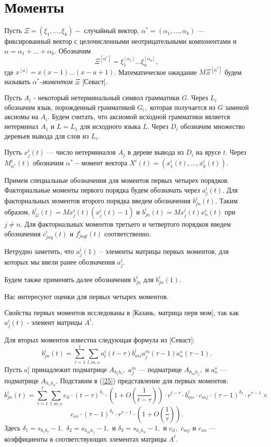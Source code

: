 \documentclass[12pt,russian]{article}
\begin{document}
\section{Моменты}
{\sloppy 
Пусть $\Xi=(\xi_1,\ldots,\xi_k) -$ случайный вектор,
$\alpha^*=(\alpha_1, \ldots,\alpha_k )$ --- фиксированный вектор
с целочисленными неотрицательными компонентами и
$\alpha=\alpha_1+\ldots+\alpha_k.$ Обозначим
$$
\Xi^{[\alpha^*]}=\xi_1^{[\alpha_1]} \ldots \xi_n^{[\alpha_k]},
$$
где $x^{[a]}=x(x-1)\ldots (x-a+1).$
Математическое ожидание $M\Xi^{[\alpha^*]}$ будем называть $\alpha^*$-{\em моментом\/} $\Xi$ [Севаст].

Пусть $A_i$ - некоторый нетерминальный символ грамматики $G$. Через $L_i$ обозначим язык, порожденный грамматикой $G_i,$ которая получается из $G$ заменой аксиомы на $A_i.$ Будем считать, что аксиомой исходной грамматики является нетерминал $A_1$ и $L=L_1$ для исходного языка $L.$ 
Через $D_i$ обозначим множество деревьев вывода для слов из $L_i.$ 

Пусть $x^i_j(t) $  --- число нетерминалов $A_j$ в дереве вывода из
$D_i$ на ярусе $t.$ Через $M^i_{\alpha^*}(t)$ обозначим
$\alpha^*-$момент вектора
$X^i(t)=(x^i_1(t),\ldots,x^i_k(t)).$

Примем специальные обозначения для моментов первых
четырех порядков.
Факториальные моменты первого порядка будем обозначать через $a^i_j(t).$
Для факториальных моментов второго порядка введем обозначения
$b^i_{jn}(t).$ Таким образом, $b^i_{jj}(t)=Mx^i_j(t)(x^i_j(t)-1)$ и
$b^i_{jn}(t)=Mx^i_j(t)x^i_n(t)$ при $j\neq n.$
Для факториальных моментов третьего и четвертого порядков введем обозначения
$c^i_{jnq}(t)$ и $f^i_{jnql}(t)$ соответственно.

Нетрудно заметить, что $a^i_j(1)$ -- элементы матрицы первых моментов,
для которых мы ввели ранее обозначения $a^i_j.$

Будем также применять далее обозначения
$b^i_{jn}$ для $b^i_{jn}(1).$

Нас интересуют оценки для первых четырех моментов.

Свойства первых моментов исследованы в [Казань, матрица перв мом], так как $a^i_j(t)$ - элемент матрицы $A^t$.  

Для вторых моментов известна следующая формула из [Севаст]:
\begin{equation}
b^i_{jn}(t)=
\sum_{\tau=1}^t \sum_{l,m,s}a^i_l(t-\tau) b^l_{ms}
a^m_j(\tau-1) a^s_n(\tau-1).   
\label{25}
\end{equation}
Пусть $a^i_l$ принадлежит подматрице $A_{h_i h_l},$ $a^m_j$ --- подматрице $A_{h_m h_j},$ и $a^s_n$ --- подматрице $A_{h_s h_n}.$
Подставим в (\ref{25}) представление для первых моментов:
$$
b^i_{jn}(t)=\sum_{\tau=1}^t \sum_{l,m,s} c_{il} \cdot \left(t-\tau\right)^{\delta_1}\cdot \left(1+O\left(\frac{1}{t-\tau}\right)\right)\cdot r^{t-\tau}\cdot b^l_{ms} \cdot c_{mj}\cdot\left( \tau-1\right)^{\delta_2} \cdot r^{\tau-1}\times
$$
$$
c_{sn}\cdot\left(\tau-1\right)^{\delta_3}\cdot r^{\tau-1}\cdot \left(1+O\left(\frac{1}{\tau}\right)\right).
$$
Здесь $\delta_1=s_{h_i h_l}-1,$ $\delta_2=s_{h_m h_j}-1,$ и $\delta_3=s_{h_s h_n}-1,$ и $c_{il},$ $c_{mj}$ и  $c_{sn}$ ---
коэффициенты в соответствующих элементах матрицы $A^t.$ 


}
\end{document}
